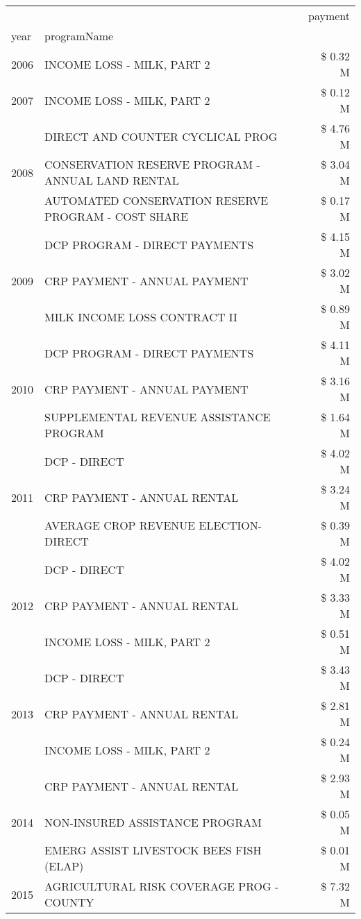 \begin{tabular}{llr}
\toprule
 &  & payment \\
year & programName &  \\
\midrule
2006 & INCOME LOSS - MILK, PART 2 & \$ 0.32 M \\
\cline{1-3}
2007 & INCOME LOSS - MILK, PART 2 & \$ 0.12 M \\
\cline{1-3}
\multirow[t]{3}{*}{2008} & DIRECT AND COUNTER CYCLICAL PROG & \$ 4.76 M \\
 & CONSERVATION RESERVE PROGRAM - ANNUAL LAND RENTAL & \$ 3.04 M \\
 & AUTOMATED CONSERVATION RESERVE PROGRAM - COST SHARE & \$ 0.17 M \\
\cline{1-3}
\multirow[t]{3}{*}{2009} & DCP PROGRAM - DIRECT PAYMENTS & \$ 4.15 M \\
 & CRP PAYMENT - ANNUAL PAYMENT & \$ 3.02 M \\
 & MILK INCOME LOSS CONTRACT II & \$ 0.89 M \\
\cline{1-3}
\multirow[t]{3}{*}{2010} & DCP PROGRAM - DIRECT PAYMENTS & \$ 4.11 M \\
 & CRP PAYMENT - ANNUAL PAYMENT & \$ 3.16 M \\
 & SUPPLEMENTAL REVENUE ASSISTANCE PROGRAM & \$ 1.64 M \\
\cline{1-3}
\multirow[t]{3}{*}{2011} & DCP - DIRECT & \$ 4.02 M \\
 & CRP PAYMENT - ANNUAL RENTAL & \$ 3.24 M \\
 & AVERAGE CROP REVENUE ELECTION-DIRECT & \$ 0.39 M \\
\cline{1-3}
\multirow[t]{3}{*}{2012} & DCP - DIRECT & \$ 4.02 M \\
 & CRP PAYMENT - ANNUAL RENTAL & \$ 3.33 M \\
 & INCOME LOSS - MILK, PART 2 & \$ 0.51 M \\
\cline{1-3}
\multirow[t]{3}{*}{2013} & DCP - DIRECT & \$ 3.43 M \\
 & CRP PAYMENT - ANNUAL RENTAL & \$ 2.81 M \\
 & INCOME LOSS - MILK, PART 2 & \$ 0.24 M \\
\cline{1-3}
\multirow[t]{3}{*}{2014} & CRP PAYMENT - ANNUAL RENTAL & \$ 2.93 M \\
 & NON-INSURED ASSISTANCE PROGRAM & \$ 0.05 M \\
 & EMERG ASSIST LIVESTOCK BEES FISH (ELAP) & \$ 0.01 M \\
\cline{1-3}
\multirow[t]{3}{*}{2015} & AGRICULTURAL RISK COVERAGE PROG - COUNTY & \$ 7.32 M \\

\end{tabular}
